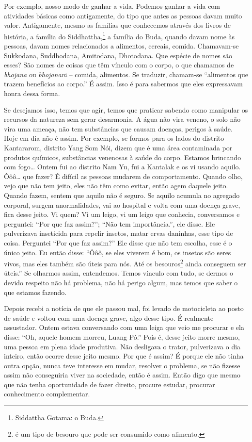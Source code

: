 Por exemplo, nosso modo de ganhar a vida. Podemos ganhar a vida com
atividades básicas como antigamente, do tipo que antes as pessoas davam
muito valor. Antigamente, mesmo as famílias que conhecemos através dos
livros de história, a família do Siddhattha,\footnote{Siddattha Gotama:
o Buda.} a família do Buda, quando davam nome às pessoas, davam nomes
relacionados a alimentos, cereais, comida. Chamavam-se Sukkodana,
Suddhodana, Amitodana, Dhotodana. Que espécie de nomes são esses? São
nomes de coisas que têm vínculo com o corpo, o que chamamos de
\emph{bhojana} ou \emph{bhojanaṁ} – comida, alimentos. Se traduzir,
chamam-se “alimentos que trazem benefícios
ao corpo.” É assim. Isso é para sabermos que eles expressavam honra
dessa forma. 

Se desejamos isso, temos que agir, temos que praticar sabendo como
manipular os recursos da natureza sem gerar desarmonia. A água não vira
veneno, o solo não vira uma ameaça, não tem substâncias que causam
doenças, perigos à saúde. Hoje em dia não é assim. Por exemplo, se
formos para os lados do distrito Kantararom, distrito Yang Som Nói,
dizem que é uma área contaminada por produtos químicos, substâncias
venenosas à saúde do corpo. Estamos brincando com fogo\ldots{} Ontem fui ao
distrito Nam Yu, fui a Kantalak e os vi usando aquilo. Ôôô\ldots{} que fazer?
É difícil as pessoas mudarem de comportamento. Quando olho, vejo que
não tem jeito, eles não têm como evitar, então agem daquele jeito.
Quando fazem, sentem que aquilo não é seguro. Se aquilo acumula no
agregado corporal, surgem anormalidades, vai ao hospital e volta com
uma doença grave, fica desse jeito. Vi quem? Vi um leigo, vi um leigo
que conhecia, conversamos e perguntei: “Por que faz assim?”; “Não tem
importância.”, ele disse. Ele pulverizava inseticida para repelir
insetos, matar ervas daninhas, esse tipo de coisa. Perguntei “Por que
faz assim?” Ele disse que não tem escolha, esse é o único jeito. Eu
então disse: “Ôôô, se eles viverem é bom, os insetos são seres vivos,
mas eles também são úteis para nós. Até os
besouros\footnote{ é um
tipo de besouro que pode ser consumido como alimento.} ainda conseguem
ser úteis.” Se olharmos assim, entendemos. Temos vínculo com tudo, se
dermos o devido respeito não há problema, não há perigo algum, mas
temos que saber o que estamos fazendo. 

Depois recebi a notícia de que ele passou mal, foi levado de
motocicleta ao posto de saúde e voltou com uma doença grave, algo desse
tipo. É realmente assustador. Ontem estava conversando com uma leiga
que veio me procurar e ela disse: “Oh, aquele homem morreu, Luang Pó.”
Pois é, desse jeito morre mesmo, uma pessoa em plena idade produtiva.
Não desligava o trator, pulverizava o dia inteiro, então ocorre desse
jeito mesmo. Por que é assim? É porque ele não tinha outra opção, nunca
teve interesse em mudar, resolver o problema, se não fizesse assim não
conseguiria viver na sociedade, então é assim. Então digo que mesmo que
não tenha oportunidade de fazer direito, procure estudar, procurar
conhecimento complementar.

